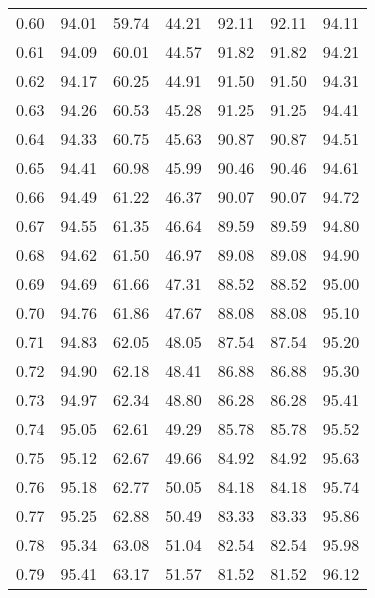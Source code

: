 \begin{tabular}{|c|c|c|c|c|c|c|}
      0.60 &     94.01 &     59.74 &      44.21 &   92.11 &      92.11 &         94.11 \\
      0.61 &     94.09 &     60.01 &      44.57 &   91.82 &      91.82 &         94.21 \\
      0.62 &     94.17 &     60.25 &      44.91 &   91.50 &      91.50 &         94.31 \\
      0.63 &     94.26 &     60.53 &      45.28 &   91.25 &      91.25 &         94.41 \\
      0.64 &     94.33 &     60.75 &      45.63 &   90.87 &      90.87 &         94.51 \\
      0.65 &     94.41 &     60.98 &      45.99 &   90.46 &      90.46 &         94.61 \\
      0.66 &     94.49 &     61.22 &      46.37 &   90.07 &      90.07 &         94.72 \\
      0.67 &     94.55 &     61.35 &      46.64 &   89.59 &      89.59 &         94.80 \\
      0.68 &     94.62 &     61.50 &      46.97 &   89.08 &      89.08 &         94.90 \\
      0.69 &     94.69 &     61.66 &      47.31 &   88.52 &      88.52 &         95.00 \\
      0.70 &     94.76 &     61.86 &      47.67 &   88.08 &      88.08 &         95.10 \\
      0.71 &     94.83 &     62.05 &      48.05 &   87.54 &      87.54 &         95.20 \\
      0.72 &     94.90 &     62.18 &      48.41 &   86.88 &      86.88 &         95.30 \\
      0.73 &     94.97 &     62.34 &      48.80 &   86.28 &      86.28 &         95.41 \\
      0.74 &     95.05 &     62.61 &      49.29 &   85.78 &      85.78 &         95.52 \\
      0.75 &     95.12 &     62.67 &      49.66 &   84.92 &      84.92 &         95.63 \\
      0.76 &     95.18 &     62.77 &      50.05 &   84.18 &      84.18 &         95.74 \\
      0.77 &     95.25 &     62.88 &      50.49 &   83.33 &      83.33 &         95.86 \\
      0.78 &     95.34 &     63.08 &      51.04 &   82.54 &      82.54 &         95.98 \\
      0.79 &     95.41 &     63.17 &      51.57 &   81.52 &      81.52 &         96.12 \\

\end{tabular}
